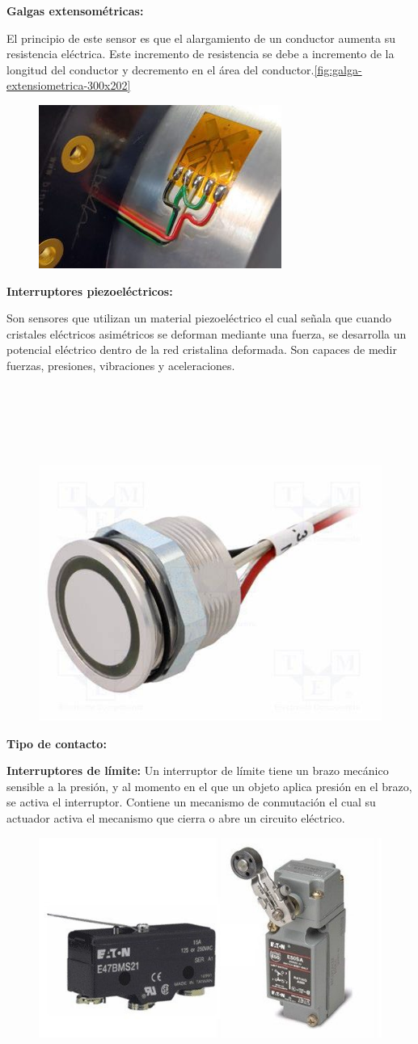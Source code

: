 \textbf{Galgas extensométricas:}

El principio de este sensor es que el alargamiento de un conductor aumenta su resistencia eléctrica. Este incremento de resistencia se debe a incremento de la longitud del conductor y decremento en el área del conductor.\autoref{fig:galga-extensiometrica-300x202}

\begin{figure}[h]
	\centering
	\includegraphics[width=0.3\linewidth, height=0.2\textheight]{img/galga-extensiometrica-300x202}
	\caption{}
	\label{fig:galga-extensiometrica-300x202}
\end{figure}

\textbf{Interruptores piezoeléctricos:}

Son sensores que utilizan un material piezoeléctrico el cual señala que cuando cristales eléctricos asimétricos se deforman mediante una fuerza, se desarrolla un potencial eléctrico dentro de la red cristalina deformada. Son capaces de medir fuerzas, presiones, vibraciones y aceleraciones.\\\\\\\\\\\\


\begin{figure}[h]
	\centering
	\includegraphics[width=0.3\linewidth, height=0.2\textheight]{img/S}
	\caption[f]{}
	\label{fig:s}
\end{figure}

\textbf{Tipo de contacto: }

\textbf{Interruptores de límite: }
Un interruptor de límite tiene un brazo mecánico sensible a la presión, y al momento  en el que un  objeto aplica presión en el brazo, se activa el interruptor.  Contiene un mecanismo de conmutación el cual su actuador activa el mecanismo que cierra o abre un circuito eléctrico. 
\begin{figure}[h]
	\centering
	\includegraphics[width=0.4\linewidth, height=0.2\textwidth]{img/intlimite}
	\caption{}
	\label{fig:intlimite}
\end{figure}

